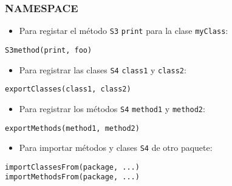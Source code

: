 \documentclass[xcolor={usenames,svgnames,dvipsnames}]{beamer}
\begin{document}
\begin{frame}[fragile]
\frametitle{NAMESPACE}
\label{sec-2-6}

\begin{itemize}
\item Para registar el método \texttt{S3} \texttt{print} para la clase \texttt{myClass}:
\end{itemize}

\lstset{language=R}
\begin{lstlisting}
S3method(print, foo)
\end{lstlisting}
\begin{itemize}
\item Para registrar las clases \texttt{S4} \texttt{class1} y \texttt{class2}:
\end{itemize}

\lstset{language=R}
\begin{lstlisting}
exportClasses(class1, class2)
\end{lstlisting}
\begin{itemize}
\item Para registrar los métodos \texttt{S4} \texttt{method1} y \texttt{method2}:
\end{itemize}

\lstset{language=R}
\begin{lstlisting}
exportMethods(method1, method2)
\end{lstlisting}
\begin{itemize}
\item Para importar métodos y clases \texttt{S4} de otro paquete:
\end{itemize}

\lstset{language=R}
\begin{lstlisting}
importClassesFrom(package, ...)
importMethodsFrom(package, ...)
\end{lstlisting}
\end{frame}
\end{document}
